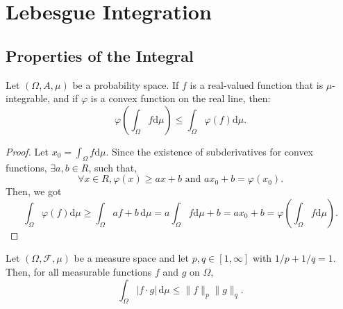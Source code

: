 \chapter{Lebesgue Integration}

\section{Properties of the Integral}

\begin{theorem}
    Let $(\Omega,A,\mu)$ be a probability space. If $f$ is a real-valued function that is $\mu$-integrable, and if $\varphi$ is a convex function on the real line, then:
    \begin{equation}
        \varphi\left(\int_{\Omega}f\mathrm{d}\mu\right)\leq\int_{\Omega}\varphi(f)\mathrm{d}\mu.
    \end{equation}
\end{theorem}

\begin{proof}
    Let $x_{0}=\int_{\Omega}f\mathrm{d}\mu$. Since the existence of subderivatives for convex functions, $\exists a,b\in R$, such that,
    \begin{equation*}
        \forall x\in R,\varphi(x)\geq ax+b\text{ and }ax_0+b=\varphi(x_0).
    \end{equation*}
    Then, we got
    \begin{equation*}
        \int_{\Omega}\varphi(f)\mathrm{d}\mu\geq\int_{\Omega}af+b\,\mathrm{d}\mu=a\int_{\Omega}f\mathrm{d}\mu+b=ax_0+b=\varphi\left(\int_{\Omega}f\mathrm{d}\mu\right).
    \end{equation*}
\end{proof}

\begin{theorem} \label{thm:holder-inequality}
    Let $(\Omega,\mathcal{F},\mu)$ be a measure space and let $p,q\in[1,\infty]$ with $1/p+1/q=1$. Then, for all measurable functions $f$ and $g$ on $\Omega$,
    \begin{equation}
        \int_{\Omega}|f\cdot g|\,\mathrm{d}\mu\leq\|f\|_{p}\|g\|_{q}.
    \end{equation}
\end{theorem}

